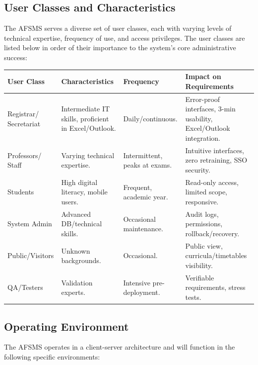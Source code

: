 \documentclass[11pt, a4paper]{article}
\renewcommand{\arraystretch}{1.3} %
\begin{document}
\subsection{User Classes and Characteristics}
The AFSMS serves a diverse set of user classes, each with varying levels of technical expertise, frequency of use, and access privileges. The user classes are listed below in order of their importance to the system's core administrative success:

\begin{table}[H]
\centering
\small
\setlength{\arraystretch}{0.85}
\begin{tabularx}{\textwidth}{>{\raggedright\arraybackslash}p{2.2cm} >{\raggedright\arraybackslash}X >{\raggedright\arraybackslash}X >{\raggedright\arraybackslash}X}
\toprule
\textbf{User Class} & \textbf{Characteristics} & \textbf{Frequency} & \textbf{Impact on Requirements} \\
\midrule
Registrar/ Secretariat & Intermediate IT skills, proficient in Excel/Outlook. & Daily/continuous. & Error-proof interfaces, 3-min usability, Excel/Outlook integration. \\
\midrule
Professors/ Staff & Varying technical expertise. & Intermittent, peaks at exams. & Intuitive interfaces, zero retraining, SSO security. \\
\midrule
Students & High digital literacy, mobile users. & Frequent, academic year. & Read-only access, limited scope, responsive. \\
\midrule
System Admin & Advanced DB/technical skills. & Occasional maintenance. & Audit logs, permissions, rollback/recovery. \\
\midrule
Public/Visitors & Unknown backgrounds. & Occasional. & Public view, curricula/timetables visibility. \\
\midrule
QA/Testers & Validation experts. & Intensive pre-deployment. & Verifiable requirements, stress tests. \\
\bottomrule
\end{tabularx}
\normalsize
\setlength{\arraystretch}{1.3}
\end{table}

\subsection{Operating Environment}
The AFSMS operates in a client-server architecture and will function in the following specific environments:
\end{document}
